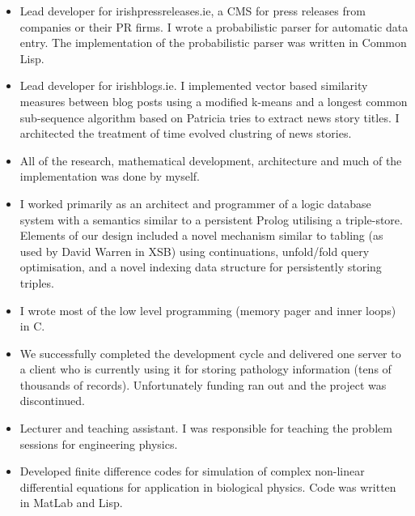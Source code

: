 \documentclass[a4paper,11pt]{moderncv}
\begin{document}
{
  \begin{itemize}
  \item Lead developer for irishpressreleases.ie, a CMS for press releases from companies or their PR firms. I wrote a probabilistic parser for automatic data entry. The implementation of the probabilistic parser was written in Common Lisp.
  \item Lead developer for irishblogs.ie. I implemented vector based similarity measures between blog posts using a modified k-means and a longest common sub-sequence algorithm based on Patricia tries to extract news story titles. I architected the treatment of time evolved clustring of news stories.
  \item All of the research, mathematical development, architecture and much of the implementation was done by myself.
  \end{itemize}
}

{
  \begin{itemize}
  \item I worked primarily as an architect and programmer of a logic database system with a semantics similar to a persistent Prolog utilising a triple-store. Elements of our design included a novel mechanism similar to tabling (as used by David Warren in XSB) using continuations, unfold/fold query optimisation, and a novel indexing data structure for persistently storing triples.
  \item I wrote most of the low level programming (memory pager and inner loops) in C.
  \item We successfully completed the development cycle and delivered one server to a client who is currently using it for storing pathology information (tens of thousands of records). Unfortunately funding ran out and the project was discontinued.
  \end{itemize}
}

{
  \begin{itemize}
  \item Lecturer and teaching assistant. I was responsible for teaching the problem sessions for engineering physics.
  \end{itemize}
}

{
  \begin{itemize}
  \item Developed finite difference codes for simulation of complex non-linear differential equations for application in biological physics. Code was written in MatLab and Lisp.
  \end{itemize}
}
\end{document}
